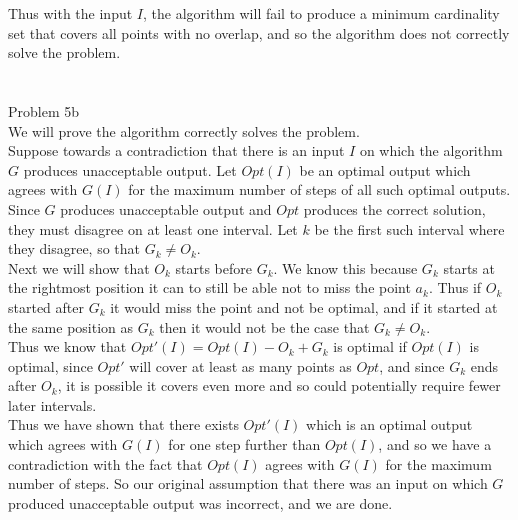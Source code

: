 \documentclass[11pt]{article}
\begin{document}
Thus with the input $I$, the algorithm will fail to produce a minimum cardinality set that covers all points with no overlap, and so the algorithm does not correctly solve the problem.\\
\\
\\
\noindent \huge 
Problem 5b\\
\normalsize
\noindent 
We will prove the algorithm correctly solves the problem.\\
Suppose towards a contradiction that there is an input $I$ on which the algorithm $G$ produces unacceptable output. Let $Opt(I)$ be an optimal output which agrees with $G(I)$ for the maximum number of steps of all such optimal outputs.\\
Since $G$ produces unacceptable output and $Opt$ produces the correct solution, they must disagree on at least one interval. Let $k$ be the first such interval where they disagree, so that $G_k \ne O_k$.\\
Next we will show that $O_k$ starts before $G_k$. We know this because $G_k$ starts at the rightmost position it can to still be able not to miss the point $a_k$. Thus if $O_k$ started after $G_k$ it would miss the point and not be optimal, and if it started at the same position as $G_k$ then it would not be the case that $G_k \ne O_k$.\\
Thus we know that $Opt'(I) = Opt(I) - O_k + G_k$ is optimal if $Opt(I)$ is optimal, since $Opt'$ will cover at least as many points as $Opt$, and since $G_k$ ends after $O_k$, it is possible it covers even more and so could potentially require fewer later intervals.\\
Thus we have shown that there exists $Opt'(I)$ which is an optimal output which agrees with $G(I)$ for one step further than $Opt(I)$, and so we have a contradiction with the fact that $Opt(I)$ agrees with $G(I)$ for the maximum number of steps. So our original assumption that there was an input on which $G$ produced unacceptable output was incorrect, and we are done.\\
\end{document}
